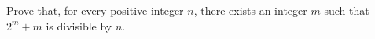 Prove that, for every positive integer $n$, there exists an integer $m$ such that $2^m + m$ is divisible by $n$.
